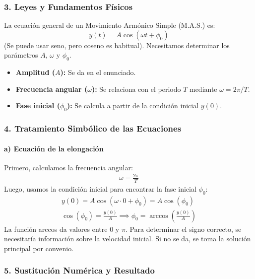 \subsubsection*{3. Leyes y Fundamentos Físicos}
La ecuación general de un Movimiento Armónico Simple (M.A.S.) es:
$$ y(t) = A \cos(\omega t + \phi_0) $$
(Se puede usar seno, pero coseno es habitual). Necesitamos determinar los parámetros $A$, $\omega$ y $\phi_0$.
\begin{itemize}
    \item \textbf{Amplitud ($A$):} Se da en el enunciado.
    \item \textbf{Frecuencia angular ($\omega$):} Se relaciona con el periodo $T$ mediante $\omega = 2\pi/T$.
    \item \textbf{Fase inicial ($\phi_0$):} Se calcula a partir de la condición inicial $y(0)$.
\end{itemize}

\subsubsection*{4. Tratamiento Simbólico de las Ecuaciones}
\paragraph{a) Ecuación de la elongación}
Primero, calculamos la frecuencia angular:
\begin{gather}
    \omega = \frac{2\pi}{T}
\end{gather}
Luego, usamos la condición inicial para encontrar la fase inicial $\phi_0$:
\begin{gather}
    y(0) = A \cos(\omega \cdot 0 + \phi_0) = A \cos(\phi_0) \nonumber \\
    \cos(\phi_0) = \frac{y(0)}{A} \implies \phi_0 = \arccos\left(\frac{y(0)}{A}\right)
\end{gather}
La función arccos da valores entre $0$ y $\pi$. Para determinar el signo correcto, se necesitaría información sobre la velocidad inicial. Si no se da, se toma la solución principal por convenio.

\subsubsection*{5. Sustitución Numérica y Resultado}
